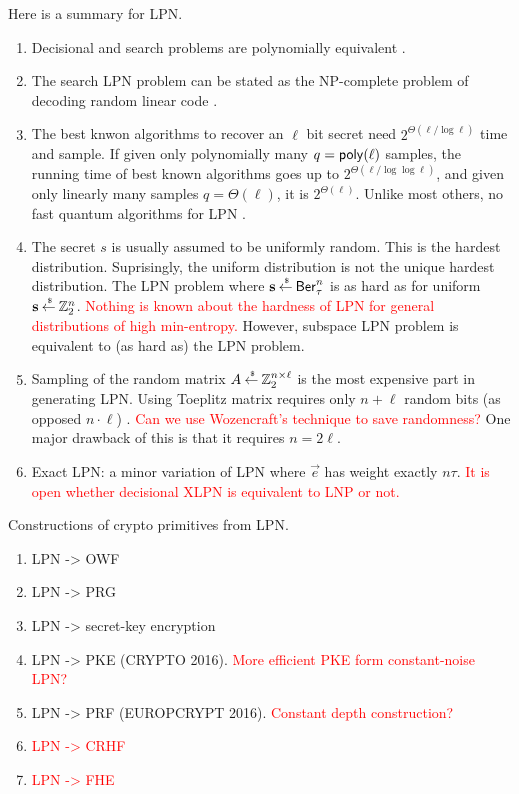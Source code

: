 \noindent Here is a summary for LPN. 
\begin{enumerate}
	\item Decisional and search problems are polynomially equivalent \cite{??}. 
	\item The search LPN problem can be stated as the NP-complete problem of decoding random linear code \cite{??}.
	\item The best knwon algorithms to recover an $ \ell $ bit secret need $ 2^{\Theta(\ell / \log \ell)} $ time and sample. If given only polynomially many $ q = \mathsf{poly}(\ell) $ samples, the running time of best known algorithms goes up to $ 2^{\Theta(\ell/ \log \log \ell)} $, and given only linearly many samples $ q = \Theta(\ell) $, it is $ 2^{\Theta(\ell)} $. Unlike most others, no fast quantum algorithms for LPN \cite{??}. 
	\item The secret $ s $ is usually assumed to be uniformly random. This is the hardest distribution. Suprisingly, the uniform distribution is not the unique hardest distribution. The LPN problem where $ \mathbf{s} \mathbin{\stackrel{\mbox{\,\tiny \$}}{\gets}} \mathsf{Ber}^n_\tau $ is as hard as for uniform $ \mathbf{s} \mathbin{\stackrel{\mbox{\,\tiny \$}}{\gets}}  {\mathbb Z}^n_2 $. 
	\textcolor{red}{Nothing is known about the hardness of LPN for general distributions of high min-entropy.} However, subspace LPN problem is equivalent to (as hard as) the LPN problem. 
	\item Sampling of the random matrix $ A  \mathbin{\stackrel{\mbox{\,\tiny \$}}{\gets}} {\mathbb Z}^{n\times \ell}_2 $ is the most expensive part in generating LPN. Using Toeplitz matrix requires only $ n + \ell $ random bits (as opposed $ n \cdot \ell $) \cite{??}. \textcolor{red}{Can we use  Wozencraft's technique to save randomness?} One major drawback of this is that it requires $ n = 2 \ell $.
	\item  Exact LPN: a minor variation of LPN where $ \vec{e} $ has weight exactly $ n \tau $. \textcolor{red}{It is open whether decisional XLPN is equivalent to LNP or not.} 
\end{enumerate} 

\noindent Constructions of crypto primitives from LPN. 
\begin{enumerate}
	\item LPN -> OWF
	\item LPN -> PRG
	\item LPN -> secret-key encryption \cite{??}
	\item LPN -> PKE \cite{??} (CRYPTO 2016). \textcolor{red}{More efficient PKE form constant-noise LPN?}
	\item LPN -> PRF \cite{??} (EUROPCRYPT 2016). \textcolor{red}{Constant depth construction?}
	\item \textcolor{red}{LPN -> CRHF}
	\item \textcolor{red}{LPN -> FHE}
\end{enumerate}
